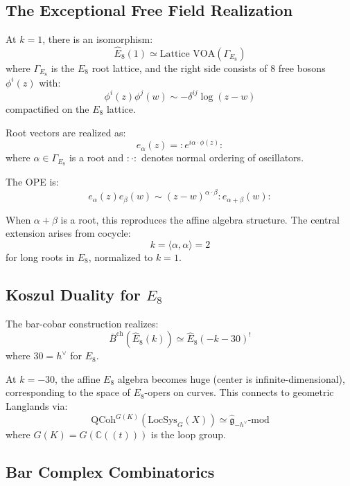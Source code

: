 \subsection{The Exceptional Free Field Realization}

\begin{theorem}
\label{thm:frenkel-kac-e8}
At $k=1$, there is an isomorphism:
$$\widehat{E}_8(1) \simeq \text{Lattice VOA}(\Gamma_{E_8})$$
where $\Gamma_{E_8}$ is the $E_8$ root lattice, and the right side consists of $8$ free bosons $\phi^i(z)$ with:
$$\phi^i(z)\phi^j(w) \sim -\delta^{ij} \log(z-w)$$
compactified on the $E_8$ lattice.
\end{theorem}

\begin{construction}
Root vectors are realized as:
$$e_{\alpha}(z) = : e^{i\alpha \cdot \phi(z)} :$$
where $\alpha \in \Gamma_{E_8}$ is a root and $:\cdot:$ denotes normal ordering of oscillators.

The OPE is:
$$e_{\alpha}(z)e_{\beta}(w) \sim (z-w)^{\alpha \cdot \beta} : e_{\alpha+\beta}(w) :$$

When $\alpha + \beta$ is a root, this reproduces the affine algebra structure. The central extension arises from cocycle:
$$k = \langle \alpha, \alpha \rangle = 2$$
for long roots in $E_8$, normalized to $k=1$.
\end{construction}

\subsection{Koszul Duality for $E_8$}

\begin{theorem}
The bar-cobar construction realizes:
$$\bar{B}^{\text{ch}}(\widehat{E}_8(k)) \simeq \widehat{E}_8(-k-30)^!$$
where $30 = h^\vee$ for $E_8$.
\end{theorem}

\begin{corollary}
At $k = -30$, the affine $E_8$ algebra becomes huge (center is infinite-dimensional), corresponding to the space of $E_8$-opers on curves. This connects to geometric Langlands via:
$$\text{QCoh}^{G(K)}(\text{LocSys}_G(X)) \simeq \widehat{\mathfrak{g}}_{-h^\vee}\text{-mod}$$
where $G(K) = G(\mathbb{C}((t)))$ is the loop group.
\end{corollary}

\subsection{Bar Complex Combinatorics}

